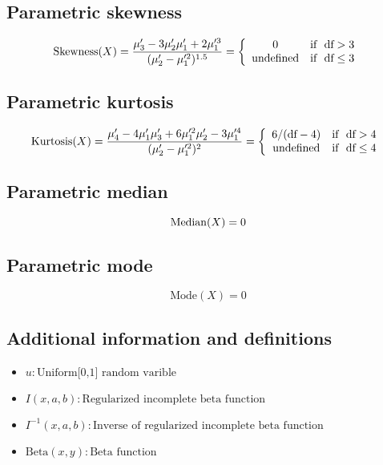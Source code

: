 \documentclass{article}
\begin{document}
\subsection{Parametric skewness}
\begin{equation*} \mathrm{Skewness}(X)=\frac{\mu'_{3}-3\mu'_{2}\mu'_{1}+2\mu'^{3}_{1}}{(\mu'_{2}-\mu'^{2}_{1})^{1.5}}=\left\{\begin{array}{cl} 0 & \text{if } \ \text{df} > 3 \\ \text{undefined} & \text{if } \  \text{df} \leq 3 \end{array} \right.\\ \end{equation*}
\subsection{Parametric kurtosis}
\begin{equation*} \mathrm{Kurtosis}(X)=\frac{\mu'_{4}-4\mu'_{1}\mu'_{3}+6\mu'^{2}_{1}\mu'_{2}-3\mu'^{4}_{1}}{(\mu'_{2}-\mu'^{2}_{1})^{2}}=\left\{\begin{array}{cl} 6/(\text{df}-4) & \text{if } \ \text{df} > 4 \\ \text{undefined} & \text{if } \ \text{df} \leq 4 \end{array} \right.\\ \end{equation*}
\subsection{Parametric median}
\begin{equation*} \mathrm{Median}(X)=0\\ \end{equation*}
\subsection{Parametric mode}
\begin{equation*} \mathrm{Mode}(X)=0 \end{equation*}
\subsection{Additional information and definitions}
\begin{itemize}
    \item $ u:\text{Uniform[0,1] random varible} $
    \item $ I\left(x,a,b\right):\text{Regularized incomplete beta function} $
    \item $ I^{-1}\left(x,a,b\right):\text{Inverse of regularized incomplete beta function} $
    \item $ \text{Beta}\left(x,y\right):\text{Beta function} $
\end{itemize}
\end{document}
